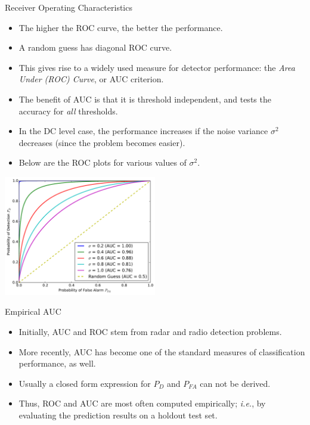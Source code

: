\documentclass[10pt, aspectratio=169]{beamer} %
\begin{document}
\begin{frame}[allowframebreaks=0.8]
 {Receiver Operating Characteristics}
\begin{itemize}
\item The higher the ROC curve, the better the performance. 
\item A random guess has diagonal ROC curve.
\item This gives rise to a widely used measure for detector
performance: the \emph{Area Under (ROC) Curve}, or AUC criterion.
\item The benefit of AUC is that it is threshold independent, and tests
the accuracy for \textit{all} thresholds.
\item In the DC level case, the performance increases if the noise variance $\sigma^2$ decreases (since the 
problem becomes easier).
\item Below are the ROC plots for various values of $\sigma^2$.

\end{itemize}
\centerline{\includegraphics[width=0.5\textwidth]{RocCurve2.pdf}}
\end{frame}

\begin{frame}[allowframebreaks=0.8]
 {Empirical AUC}
\begin{itemize}
\item Initially, AUC and ROC stem from radar and radio detection problems.
\item More recently, AUC has become one of the standard measures of classification performance, as well.
\item Usually a closed form expression for $P_D$ and $P_{FA}$ can not be derived.
\item Thus, ROC and AUC are most often computed empirically;\textit{ i.e.}, by evaluating the prediction results
on a holdout test set.
\end{itemize}
\end{frame}
\end{document}
